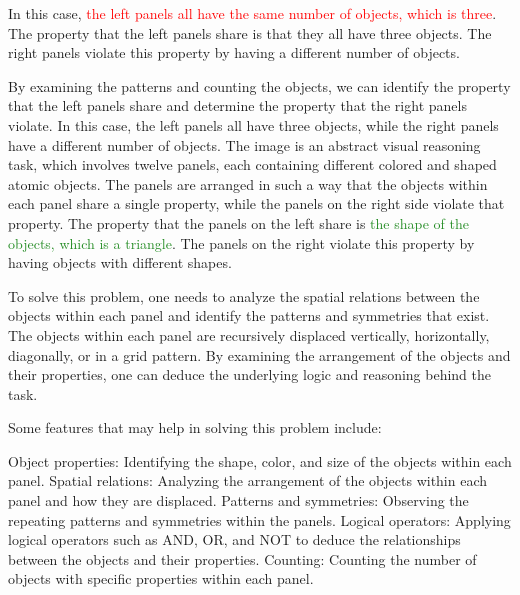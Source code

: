\begin{tcolorbox}[breakable,enhanced jigsaw,opacityback=0,]
\begin{dialogue}
		In this case, \textcolor{red}{the left panels all have the same number of objects, which is three}. The property that the left panels share is that they all have three objects. The right panels violate this property by having a different number of objects.
		
		By examining the patterns and counting the objects, we can identify the property that the left panels share and determine the property that the right panels violate. In this case, the left panels all have three objects, while the right panels have a different number of objects.
		\vspace{1em}
		 The image is an abstract visual reasoning task, which involves twelve panels, each containing different colored and shaped atomic objects. The panels are arranged in such a way that the objects within each panel share a single property, while the panels on the right side violate that property. The property that the panels on the left share is \textcolor{ForestGreen}{the shape of the objects, which is a triangle}. The panels on the right violate this property by having objects with different shapes.
		
		To solve this problem, one needs to analyze the spatial relations between the objects within each panel and identify the patterns and symmetries that exist. The objects within each panel are recursively displaced vertically, horizontally, diagonally, or in a grid pattern. By examining the arrangement of the objects and their properties, one can deduce the underlying logic and reasoning behind the task.
		
		Some features that may help in solving this problem include:
		
		Object properties: Identifying the shape, color, and size of the objects within each panel.
		Spatial relations: Analyzing the arrangement of the objects within each panel and how they are displaced.
		Patterns and symmetries: Observing the repeating patterns and symmetries within the panels.
		Logical operators: Applying logical operators such as AND, OR, and NOT to deduce the relationships between the objects and their properties.
		Counting: Counting the number of objects with specific properties within each panel.
		

\end{dialogue}
\end{tcolorbox}
